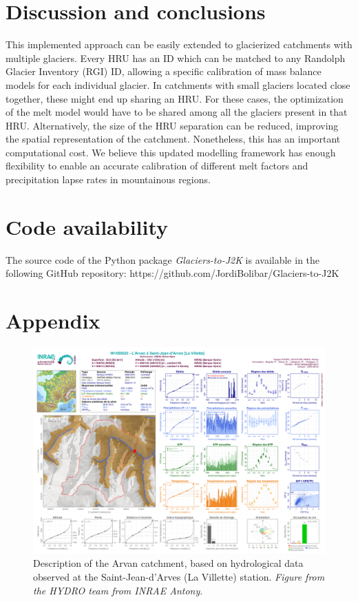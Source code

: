 \section{Discussion and conclusions}

This implemented approach can be easily extended to glacierized catchments with multiple glaciers. Every HRU has an ID which can be matched to any Randolph Glacier Inventory (RGI) ID, allowing a specific calibration of mass balance models for each individual glacier. In catchments with small glaciers located close together, these might end up sharing an HRU. For these cases, the optimization of the melt model would have to be shared among all the glaciers present in that HRU. Alternatively, the size of the HRU separation can be reduced, improving the spatial representation of the catchment. Nonetheless, this has an important computational cost. We believe this updated modelling framework has enough flexibility to enable an accurate calibration of different melt factors and precipitation lapse rates in mountainous regions. 

\section{Code availability}

The source code of the Python package \textit{Glaciers-to-J2K} is available in the following GitHub repository: https://github.com/JordiBolibar/Glaciers-to-J2K

\section{Appendix}

\begin{figure}
\centering
\includegraphics[width=23cm]{Figures/hydro/Figure_S1.png}
\captionsetup{justification=centering}
\caption{Description of the Arvan catchment, based on hydrological data observed at the Saint-Jean-d'Arves (La Villette) station. 
\textit{Figure from the HYDRO team from INRAE Antony}.}
\label{hydro:figA1}
\end{figure}




